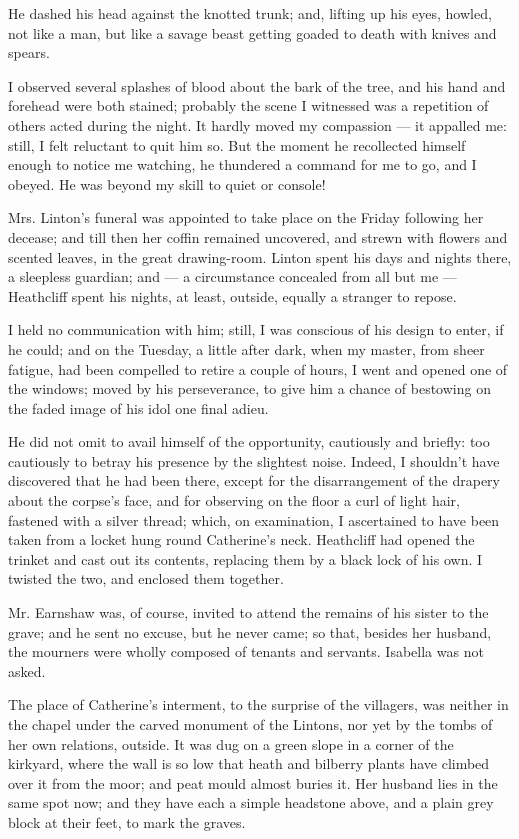 \par He dashed his head against the knotted trunk; and, lifting up his eyes, howled, not like a man, but like a savage beast getting goaded to death with knives and spears.
\par I observed several splashes of blood about the bark of the tree, and his hand and forehead were both stained; probably the scene I witnessed was a repetition of others acted during the night. It hardly moved my compassion — it appalled me: still, I felt reluctant to quit him so. But the moment he recollected himself enough to notice me watching, he thundered a command for me to go, and I obeyed. He was beyond my skill to quiet or console!
\par Mrs. Linton's funeral was appointed to take place on the Friday following her decease; and till then her coffin remained uncovered, and strewn with flowers and scented leaves, in the great drawing-room. Linton spent his days and nights there, a sleepless guardian; and — a circumstance concealed from all but me — Heathcliff spent his nights, at least, outside, equally a stranger to repose.
\par I held no communication with him; still, I was conscious of his design to enter, if he could; and on the Tuesday, a little after dark, when my master, from sheer fatigue, had been compelled to retire a couple of hours, I went and opened one of the windows; moved by his perseverance, to give him a chance of bestowing on the faded image of his idol one final adieu.
\par He did not omit to avail himself of the opportunity, cautiously and briefly: too cautiously to betray his presence by the slightest noise. Indeed, I shouldn't have discovered that he had been there, except for the disarrangement of the drapery about the corpse's face, and for observing on the floor a curl of light hair, fastened with a silver thread; which, on examination, I ascertained to have been taken from a locket hung round Catherine's neck. Heathcliff had opened the trinket and cast out its contents, replacing them by a black lock of his own. I twisted the two, and enclosed them together.
\par Mr. Earnshaw was, of course, invited to attend the remains of his sister to the grave; and he sent no excuse, but he never came; so that, besides her husband, the mourners were wholly composed of tenants and servants. Isabella was not asked.
\par The place of Catherine's interment, to the surprise of the villagers, was neither in the chapel under the carved monument of the Lintons, nor yet by the tombs of her own relations, outside. It was dug on a green slope in a corner of the kirkyard, where the wall is so low that heath and bilberry plants have climbed over it from the moor; and peat mould almost buries it. Her husband lies in the same spot now; and they have each a simple headstone above, and a plain grey block at their feet, to mark the graves.


